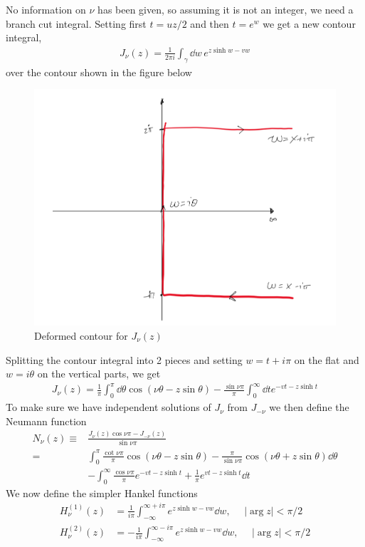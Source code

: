 \documentclass[a4paper,12pt]{article}
\begin{document}
No information on $\nu$ has been given, so assuming it is not an integer, we need a branch cut integral. Setting first $t=uz/2$ and then $t=e^w$ we get a new contour integral,
\begin{equation}
	\begin{aligned}
		J_\nu(z)=\frac{1}{2\pi i} \int_\gamma \dd w\, e^{z\sinh{w} -vw}
	\end{aligned}
\end{equation}
over the contour shown in the figure below
\begin{figure}[H]
	\centering
	\includegraphics[width=0.5\linewidth]{26}
	\caption{Deformed contour for $J_\nu(z)$}
	\label{fig:rectangle}
\end{figure}
Splitting the contour integral into 2 pieces and setting $w=t+i\pi$ on the flat and $w=i\theta$ on the vertical parts, we get
\begin{equation}
	\begin{aligned}
	J_\nu(z)=\frac{1}{\pi} \int_0^\pi \dd \theta\cos(\nu\theta -z\sin\theta)
	-\frac{\sin\nu\pi}{\pi} \int_0^\infty\dd t e^{-vt-z\sinh t}
	\end{aligned}
\end{equation}
To make sure we have independent solutions of $J_{\nu}$ from $J_{-\nu}$ we then define the Neumann function
\begin{equation}
	\begin{aligned}
		N_\nu(z)\equiv& \frac{J_\nu(z)\cos{\nu\pi-J_{-\nu}(z)}}{\sin{\nu\pi}}\\
		=&
		\int_0^\pi \frac{\cot{\nu\pi}}{\pi}\cos(\nu\theta -z\sin\theta)-\frac{\pi}{\sin{\nu\pi}}\cos(\nu\theta +z\sin\theta)\dd \theta\\
		&- \int_0^\infty \frac{\cos\nu\pi}{\pi} e^{-vt-z\sinh t}+\frac{1}{\pi} e^{vt-z\sinh t}\dd t
	\end{aligned}
\end{equation}
We now define the simpler Hankel functions 
\begin{equation}
	\begin{aligned}
		H_\nu^{(1)}(z)&=\frac{1}{i\pi }\int_{-\infty}^{\infty+i\pi}e^{z\sinh w-vw}\dd w,~~~~~~|\arg z|<\pi/2\\
	H_\nu^{(2)}(z)&=-\frac{1}{i\pi }\int_{-\infty}^{\infty-i\pi}e^{z\sinh w-vw}\dd w,~~~~~~|\arg z|<\pi/2\\
	\end{aligned}
\end{equation}
\end{document}
